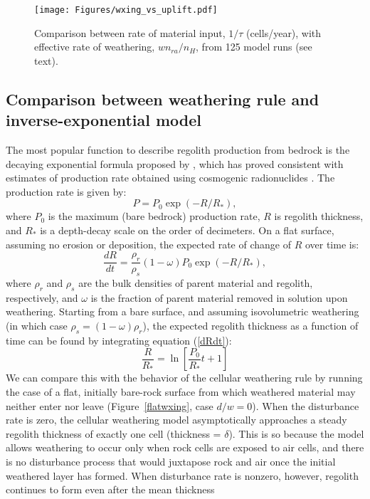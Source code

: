 \documentclass[esurf, manuscript]{copernicus}
\begin{document}
\begin{figure*}[t]
\texttt{[image: Figures/wxing\_vs\_uplift.pdf]}
\caption{Comparison between rate of material input, $1/\tau$ (cells/year), with effective rate of weathering, $w n_{ra}/n_H$, from 125 model runs (see text).}
\label{wxinguplift}
\end{figure*}


\subsection{Comparison between weathering rule and inverse-exponential model}

The most popular function to describe regolith production from bedrock is the decaying exponential formula proposed by \citet{ahnert1967role}, which has proved consistent with estimates of production rate obtained using cosmogenic radionuclides \citep{heimsath1997soil,small1999estimates}. The production rate is given by:
\begin{equation}
P = P_0 \exp \left( -R / R_* \right),
\end{equation}
where $P_0$ is the maximum (bare bedrock) production rate, $R$ is regolith thickness, and $R_*$ is a depth-decay scale on the order of decimeters. On a flat surface, assuming no erosion or deposition, the expected rate of change of $R$ over time is:
\begin{equation}
\frac{dR}{dt} = \frac{\rho_r}{\rho_s} (1-\omega ) P_0 \exp \left( -R / R_* \right),
\label{dRdt}
\end{equation}
where $\rho_r$ and $\rho_s$ are the bulk densities of parent material and regolith, respectively, and $\omega$ is the fraction of parent material removed in solution upon weathering. Starting from a bare surface, and assuming isovolumetric weathering (in which case $\rho_s = (1-\omega ) \rho_r$), the expected regolith thickness as a function of time can be found by integrating equation (\ref{dRdt}):
\begin{equation}
\frac{R}{R_*} = \ln \left[ \frac{P_0}{R_*} t + 1 \right]
\end{equation}
We can compare this with the behavior of the cellular weathering rule by running the case of a flat, initially bare-rock surface from which weathered material may neither enter nor leave (Figure~\ref{flatwxing}, case $d/w=0$). When the disturbance rate is zero, the cellular weathering model asymptotically approaches a steady regolith thickness of exactly one cell (thickness = $\delta$). This is so because the model allows weathering to occur only when rock cells are exposed to air cells, and there is no disturbance process that would juxtapose rock and air once the initial weathered layer has formed. When disturbance rate is nonzero, however, regolith continues to form even after the mean thickness %
\end{document}
